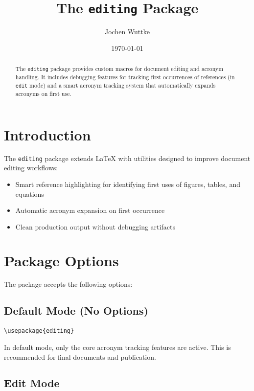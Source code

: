 \documentclass[11pt]{article}
\title{The \texttt{editing} Package}
\author{Jochen Wuttke}
\date{\today}
\begin{document}
\maketitle

\begin{abstract}
The \texttt{editing} package provides custom macros for document editing and acronym handling. 
It includes debugging features for tracking first occurrences of references (in \texttt{edit} mode) 
and a smart acronym tracking system that automatically expands acronyms on first use.
\end{abstract}

\tableofcontents

\section{Introduction}

The \texttt{editing} package extends \LaTeX{} with utilities designed to improve document editing workflows:
\begin{itemize}
  \item Smart reference highlighting for identifying first uses of figures, tables, and equations
  \item Automatic acronym expansion on first occurrence
  \item Clean production output without debugging artifacts
\end{itemize}

\section{Package Options}

The package accepts the following options:

\subsection{Default Mode (No Options)}

\begin{verbatim}
\usepackage{editing}
\end{verbatim}

In default mode, only the core acronym tracking features are active. 
This is recommended for final documents and publication.

\subsection{Edit Mode}
\end{document}
